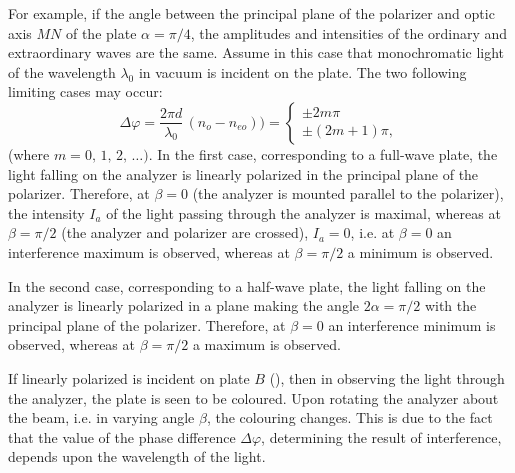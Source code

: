 For example, if the angle between the principal plane of the
polarizer and optic axis $MN$ of the plate $\alpha = \pi/4$, the amplitudes and intensities of the ordinary and extraordinary waves are the same. Assume in this case that monochromatic light of the wavelength $\lambda_{0}$ in vacuum is incident on the plate. The two following limiting cases may occur:
\begin{equation*}%
\Delta \varphi = \frac{2\pi d}{\lambda_{0}}\, (n_{o} - n_{eo})) =  
\begin{cases}
\pm 2 m \pi \\
 \pm (2m +1)\pi,
\end{cases}
\end{equation*}
(where $m = 0,\, 1,\, 2,\, \ldots{})$.
In the first case, corresponding to a full-wave plate, the light falling on the analyzer is linearly polarized in the principal plane of the polarizer. Therefore, at $\beta = 0$ (the analyzer is mounted parallel to the polarizer), the intensity $I_{a}$ of the light passing through the analyzer is maximal, whereas at $\beta = \pi/2$ (the analyzer and polarizer are crossed), $I_{a} = 0$, i.e. at $\beta = 0$
an interference maximum is observed, whereas at $\beta = \pi/2 $ a minimum is observed.

In the second case, corresponding to a half-wave plate, the light falling on the analyzer is linearly polarized in a plane making the angle $2\alpha = \pi/2$ with the principal plane of the polarizer. Therefore, at $\beta = 0$ an interference minimum is observed, whereas at $\beta = \pi/2$ a maximum is observed.

If linearly polarized  is incident on plate $B$ (), then in observing the light through the analyzer, the plate is seen to be coloured. Upon rotating the analyzer about the beam, i.e. in varying angle $\beta$, the colouring changes. This is due to the fact that the value of the phase difference $\Delta \varphi$, determining the result of interference, depends upon the wavelength of the light. 

